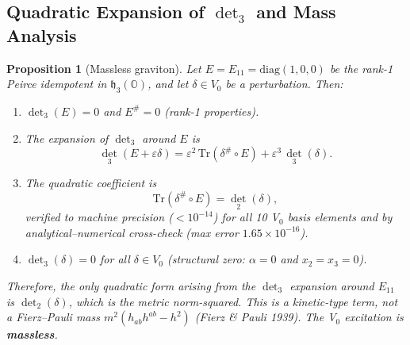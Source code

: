 \documentclass[11pt]{article}
\newtheorem{proposition}{Proposition}
\newcommand{\Tr}{\mathrm{Tr}}
\newcommand{\h}{\mathfrak{h}}
\begin{document}
\subsection{Quadratic Expansion of $\det_3$ and Mass Analysis}

\begin{proposition}[Massless graviton]\label{prop:massless}
Let $E = E_{11} = \mathrm{diag}(1,0,0)$ be the rank-1 Peirce idempotent
in $\h_3(\mathbb{O})$, and let $\delta \in V_0$ be a perturbation.
Then:
\begin{enumerate}
\item $\det_3(E) = 0$ and $E^\# = 0$ (rank-1 properties).
\item The expansion of $\det_3$ around $E$ is
\begin{equation}\label{eq:50.5}
  \det_3(E + \varepsilon\delta) = \varepsilon^2\,\Tr(\delta^\# \circ E)
    + \varepsilon^3\,\det_3(\delta).
\end{equation}
\item The quadratic coefficient is
\begin{equation}\label{eq:50.6}
  \Tr(\delta^\# \circ E) = \det_2(\delta),
\end{equation}
verified to machine precision ($< 10^{-14}$) for all 10 V$_0$ basis elements
and by analytical--numerical cross-check (max error $1.65 \times 10^{-16}$).
\item $\det_3(\delta) = 0$ for all $\delta \in V_0$
(structural zero: $\alpha = 0$ and $x_2 = x_3 = 0$).
\end{enumerate}

Therefore, the only quadratic form arising from the $\det_3$ expansion
around $E_{11}$ is $\det_2(\delta)$, which is the metric norm-squared.
This is a kinetic-type term, not a Fierz--Pauli mass
$m^2(h_{ab}h^{ab} - h^2)$ (Fierz \& Pauli 1939).
The V$_0$ excitation is \textbf{massless}.
\end{proposition}
\end{document}
